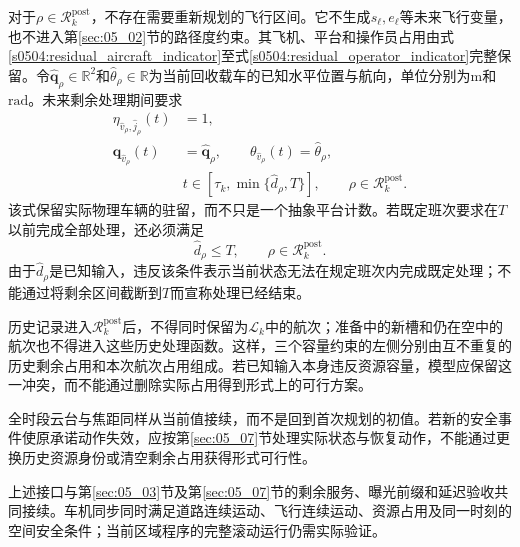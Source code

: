 对于$\rho\in\mathcal R_k^{\mathrm{post}}$，不存在需要重新规划的飞行区间。它不生成$s_\ell,e_\ell$等未来飞行变量，也不进入第\ref{sec:05_02}节的路径度约束。其飞机、平台和操作员占用由式\eqref{s0504:residual_aircraft_indicator}至式\eqref{s0504:residual_operator_indicator}完整保留。令$\widehat{\mathbf q}_\rho\in\mathbb R^2$和$\widehat\theta_\rho\in\mathbb R$为当前回收载车的已知水平位置与航向，单位分别为$\mathrm m$和$\mathrm{rad}$。未来剩余处理期间要求
\begin{equation}
 \begin{aligned}
 \eta_{\widehat v_\rho,\widehat j_\rho}(t)&=1,\\
 \mathbf q_{\widehat v_\rho}(t)&=\widehat{\mathbf q}_\rho,
 \qquad\theta_{\widehat v_\rho}(t)=\widehat\theta_\rho,\\
 &t\in[\tau_k,\min\{\widehat d_\rho,T\}],
 \qquad\rho\in\mathcal R_k^{\mathrm{post}}.
 \end{aligned}
 \label{s0504:historical_recovery_dwell}
\end{equation}
该式保留实际物理车辆的驻留，而不只是一个抽象平台计数。若既定班次要求在$T$以前完成全部处理，还必须满足
\begin{equation}
 \widehat d_\rho\le T,
 \qquad\rho\in\mathcal R_k^{\mathrm{post}}.
 \label{s0504:historical_processing_horizon}
\end{equation}
由于$\widehat d_\rho$是已知输入，违反该条件表示当前状态无法在规定班次内完成既定处理；不能通过将剩余区间截断到$T$而宣称处理已经结束。

历史记录进入$\mathcal R_k^{\mathrm{post}}$后，不得同时保留为$\mathcal L_k$中的航次；准备中的新槽和仍在空中的航次也不得进入这些历史处理函数。这样，三个容量约束的左侧分别由互不重复的历史剩余占用和本次航次占用组成。若已知输入本身违反资源容量，模型应保留这一冲突，而不能通过删除实际占用得到形式上的可行方案。

全时段云台与焦距同样从当前值接续，而不是回到首次规划的初值。若新的安全事件使原承诺动作失效，应按第\ref{sec:05_07}节处理实际状态与恢复动作，不能通过更换历史资源身份或清空剩余占用获得形式可行性。

上述接口与第\ref{sec:05_03}节及第\ref{sec:05_07}节的剩余服务、曝光前缀和延迟验收共同接续。车机同步同时满足道路连续运动、飞行连续运动、资源占用及同一时刻的空间安全条件；当前区域程序的完整滚动运行仍需实际验证。


